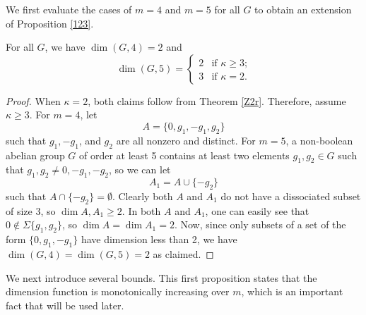 \documentclass[ml, 3cm]{sdoc}
\begin{document}
We first evaluate the cases of $m=4$ and $m=5$ for all $G$ to obtain an extension of Proposition \ref{123}.

\begin{proposition}\label{45}
    For all $G$, we have $\dim(G,4)=2$ and
    \[\dim(G,5)=\begin{cases}
    2 & \text{if $\kappa\geq3$;}\\
    3 & \text{if $\kappa=2$.}
    \end{cases}\]
\end{proposition}
\begin{proof}
    When $\kappa=2$, both claims follow from Theorem \ref{Z2r}. Therefore, assume $\kappa\geq3$. 
    For $m=4$, let
    \[A = \{0, g_1, -g_1, g_2\}\]
    such that $g_1, -g_1$, and $g_2$ are all nonzero and distinct. For $m=5$, a non-boolean abelian group $G$ of order at least 5 contains at least two elements $g_1,g_2\in G$ such that $g_1,g_2\neq 0,-g_1,-g_2$, so we can let
    \[A_1= A\cup\{-g_2\}\]
    such that $A\cap\{-g_2\}=\emptyset$. Clearly both $A$ and $A_1$ do not have a dissociated subset of size 3, so $\dim A,A_1\geq 2$. In both $A$ and $A_1$, one can easily see that $0\notin\Sigma\{g_1,g_2\}$, so $\dim A =\dim A_1=2$. Now, since only subsets of a set of the form $\{0,g_1,-g_1\}$ have dimension less than 2, we have $\dim(G,4)=\dim(G,5)=2$ as claimed.
\end{proof}


We next introduce several bounds. This first proposition states that the dimension function is monotonically increasing over $m$, which is an important fact that will be used later.
\end{document}
